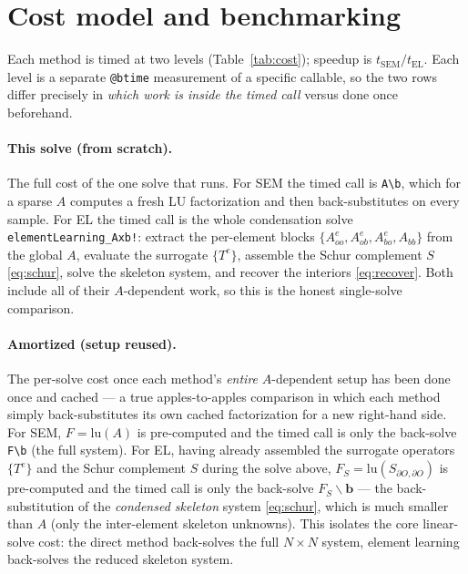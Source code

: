 \documentclass[11pt]{article}
\newcommand{\Aoo}{A_{oo}}
\newcommand{\Aob}{A_{ob}}
\newcommand{\Abo}{A_{bo}}
\newcommand{\Abb}{A_{bb}}
\begin{document}
\section{Cost model and benchmarking}
Each method is timed at two levels (Table~\ref{tab:cost}); speedup is
$t_{\mathrm{SEM}}/t_{\mathrm{EL}}$. Each level is a separate \texttt{@btime}
measurement of a specific callable, so the two rows differ precisely in
\emph{which work is inside the timed call} versus done once beforehand.

\paragraph{This solve (from scratch).} The full cost of the one solve that runs.
For SEM the timed call is \verb|A\b|, which for a sparse $A$ computes a fresh LU
factorization and then back-substitutes on every sample. For EL the timed call is
the whole condensation solve \verb|elementLearning_Axb!|: extract the per-element blocks
$\{\Aoo^e,\Aob^e,\Abo^e,\Abb\}$ from the global $A$, evaluate the surrogate
$\{T^e\}$, assemble the Schur complement $S$ \eqref{eq:schur}, solve the skeleton
system, and recover the interiors \eqref{eq:recover}. Both include all of their
$A$-dependent work, so this is the honest single-solve comparison.

\paragraph{Amortized (setup reused).} The per-solve cost once each method's
\emph{entire} $A$-dependent setup has been done once and cached --- a true
apples-to-apples comparison in which each method simply back-substitutes its own
cached factorization for a new right-hand side. For SEM, $F=\mathrm{lu}(A)$ is
pre-computed and the timed call is only the back-solve \verb|F\b| (the full
system). For EL, having already assembled the surrogate operators $\{T^e\}$ and the
Schur complement $S$ during the solve above, $F_S=\mathrm{lu}(S_{\partial O,\partial O})$
is pre-computed and the timed call is only the back-solve $F_S\backslash\mathbf{b}$
--- the back-substitution of the
\emph{condensed skeleton} system \eqref{eq:schur}, which is much smaller than $A$
(only the inter-element skeleton unknowns). This isolates the core linear-solve
cost: the direct method back-solves the full $N\times N$ system, element learning
back-solves the reduced skeleton system.
\end{document}
